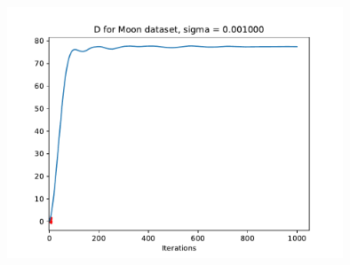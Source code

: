 \documentclass[english]{exercisesheet}
\begin{document}
\begin{solution}
\begin{figure}[H]
        \end{figure}
 \begin{figure}[H]
        \centering
        \includegraphics[width=10cm]{moon_D_iterations.pdf}
        \end{figure}
        

\end{solution}
\end{document}
